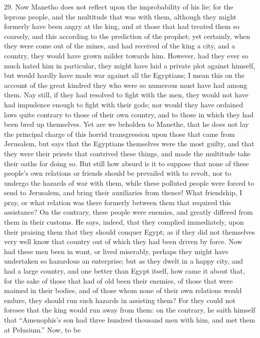 29. Now Manetho does not reflect upon the improbability of his lie; for
the leprous people, and the multitude that was with them, although they
might formerly have been angry at the king, and at those that had treated
them so coarsely, and this according to the prediction of the prophet; yet
certainly, when they were come out of the mines, and had received of the
king a city, and a country, they would have grown milder towards him.
However, had they ever so much hated him in particular, they might have
laid a private plot against himself, but would hardly have made war
against all the Egyptians; I mean this on the account of the great kindred
they who were so numerous must have had among them. Nay still, if they had
resolved to fight with the men, they would not have had impudence enough
to fight with their gods; nor would they have ordained laws quite contrary
to those of their own country, and to those in which they had been bred up
themselves. Yet are we beholden to Manethe, that he does not lay the
principal charge of this horrid transgression upon those that came from
Jerusalem, but says that the Egyptians themselves were the most guilty,
and that they were their priests that contrived these things, and made the
multitude take their oaths for doing so. But still how absurd is it to
suppose that none of these people's own relations or friends should be
prevailed with to revolt, nor to undergo the hazards of war with them,
while these polluted people were forced to send to Jerusalem, and bring
their auxiliaries from thence! What friendship, I pray, or what relation
was there formerly between them that required this assistance? On the
contrary, these people were enemies, and greatly differed from them in
their customs. He says, indeed, that they complied immediately, upon their
praising them that they should conquer Egypt; as if they did not
themselves very well know that country out of which they had been driven
by force. Now had these men been in want, or lived miserably, perhaps they
might have undertaken so hazardous an enterprise; but as they dwelt in a
happy city, and had a large country, and one better than Egypt itself, how
came it about that, for the sake of those that had of old been their
enemies, of those that were maimed in their bodies, and of those whom none
of their own relations would endure, they should run such hazards in
assisting them? For they could not foresee that the king would run away
from them: on the contrary, he saith himself that ``Amenophis's son had
three hundred thousand men with him, and met them at Pelusium.'' Now, to be
